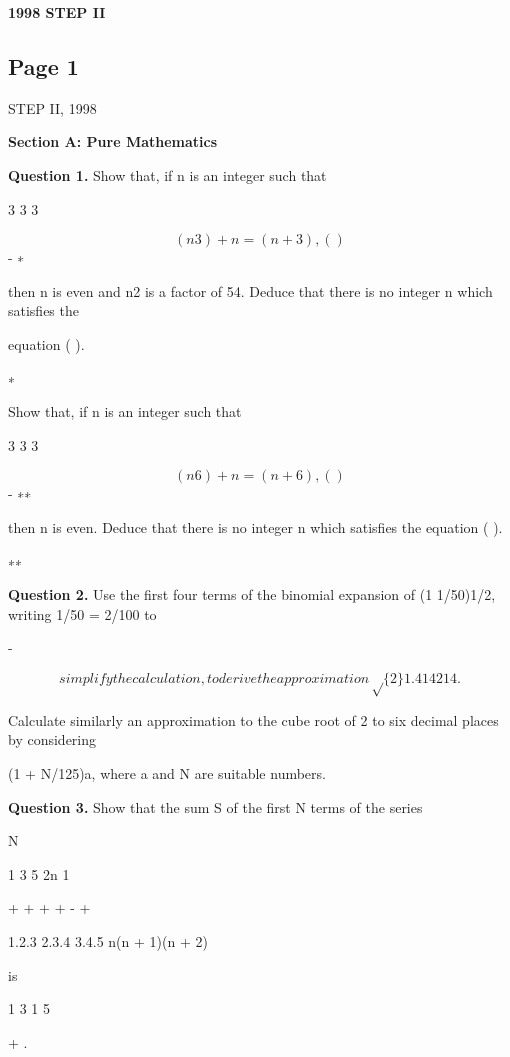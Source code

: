\documentclass[12pt]{article}
\begin{document}
\begin{center}
{\Large \textbf{1998 STEP II}}
\end{center}

\subsection*{Page 1}
\begin{flushleft}
STEP II, 1998\par
\bigskip\textbf{Section A: Pure Mathematics}\par
\bigskip\textbf{Question 1.} Show that, if n is an integer such that\par
3 3 3\par
\[(n 3) + n = (n + 3) , ( )\]
- ∗\par
then n is even and n2 is a factor of 54. Deduce that there is no integer n which satisfies the\par
equation ( ).\par
∗\par
Show that, if n is an integer such that\par
3 3 3\par
\[(n 6) + n = (n + 6) , ( )\]
- ∗∗\par
then n is even. Deduce that there is no integer n which satisfies the equation ( ).\par
∗∗\par
\bigskip\textbf{Question 2.} Use the first four terms of the binomial expansion of (1 1/50)1/2, writing 1/50 = 2/100 to\par
-\par
\[simplify the calculation, to derive the approximation \sqrt\{2\} 1.414214.\]
\approx\par
Calculate similarly an approximation to the cube root of 2 to six decimal places by considering\par
(1 + N/125)a, where a and N are suitable numbers.\par
[You need not justify the accuracy of your approximations.]\par
\bigskip\textbf{Question 3.} Show that the sum S of the first N terms of the series\par
N\par
1 3 5 2n 1\par
+ + + + - +\par
1.2.3 2.3.4 3.4.5 \cdots n(n + 1)(n + 2) \cdots\par
is\par
1 3 1 5\par
+ .\par

\end{flushleft}
\end{document}
